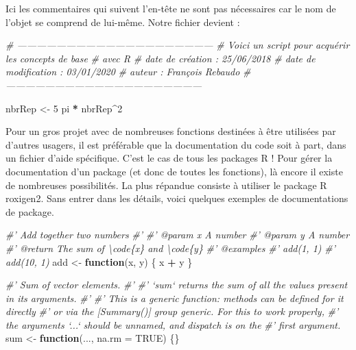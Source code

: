 \documentclass[
]{book}
\newenvironment{Shaded}{\begin{snugshade}}{\end{snugshade}}
\newcommand{\CommentTok}[1]{\textcolor[rgb]{0.56,0.35,0.01}{\textit{#1}}}
\newcommand{\ControlFlowTok}[1]{\textcolor[rgb]{0.13,0.29,0.53}{\textbf{#1}}}
\newcommand{\DataTypeTok}[1]{\textcolor[rgb]{0.13,0.29,0.53}{#1}}
\newcommand{\DecValTok}[1]{\textcolor[rgb]{0.00,0.00,0.81}{#1}}
\newcommand{\NormalTok}[1]{#1}
\newcommand{\OperatorTok}[1]{\textcolor[rgb]{0.81,0.36,0.00}{\textbf{#1}}}
\newcommand{\OtherTok}[1]{\textcolor[rgb]{0.56,0.35,0.01}{#1}}
\newcommand{\StringTok}[1]{\textcolor[rgb]{0.31,0.60,0.02}{#1}}
\begin{document}
Ici les commentaires qui suivent l'en-tête ne sont pas nécessaires car le nom de l'objet se comprend de lui-même. Notre fichier devient :

\begin{Shaded}
\begin{Highlighting}[]
\CommentTok{# ------------------------------------------------------------}
\CommentTok{# Voici un script pour acquérir les concepts de base }
\CommentTok{# avec R}
\CommentTok{# date de création : 25/06/2018}
\CommentTok{# date de modification : 03/01/2020}
\CommentTok{# auteur : François Rebaudo}
\CommentTok{# ------------------------------------------------------------}

\NormalTok{nbrRep <-}\StringTok{ }\DecValTok{5}
\NormalTok{pi }\OperatorTok{*}\StringTok{ }\NormalTok{nbrRep}\OperatorTok{^}\DecValTok{2}
\end{Highlighting}
\end{Shaded}

Pour un gros projet avec de nombreuses fonctions destinées à être utilisées par d'autres usagers, il est préférable que la documentation du code soit à part, dans un fichier d'aide spécifique. C'est le cas de tous les packages R ! Pour gérer la documentation d'un package (et donc de toutes les fonctions), là encore il existe de nombreuses possibilités. La plus répandue consiste à utiliser le package R roxigen2. Sans entrer dans les détails, voici quelques exemples de documentations de package.

\begin{Shaded}
\begin{Highlighting}[]
\CommentTok{#' Add together two numbers}
\CommentTok{#'}
\CommentTok{#' @param x A number}
\CommentTok{#' @param y A number}
\CommentTok{#' @return The sum of \textbackslash{}code\{x\} and \textbackslash{}code\{y\}}
\CommentTok{#' @examples}
\CommentTok{#' add(1, 1)}
\CommentTok{#' add(10, 1)}
\NormalTok{add <-}\StringTok{ }\ControlFlowTok{function}\NormalTok{(x, y) \{}
\NormalTok{  x }\OperatorTok{+}\StringTok{ }\NormalTok{y}
\NormalTok{\}}
\end{Highlighting}
\end{Shaded}

\begin{Shaded}
\begin{Highlighting}[]
\CommentTok{#' Sum of vector elements.}
\CommentTok{#'}
\CommentTok{#' `sum` returns the sum of all the values present in its arguments.}
\CommentTok{#'}
\CommentTok{#' This is a generic function: methods can be defined for it directly}
\CommentTok{#' or via the [Summary()] group generic. For this to work properly,}
\CommentTok{#' the arguments `...` should be unnamed, and dispatch is on the}
\CommentTok{#' first argument.}
\NormalTok{sum <-}\StringTok{ }\ControlFlowTok{function}\NormalTok{(..., }\DataTypeTok{na.rm =} \OtherTok{TRUE}\NormalTok{) \{\}}
\end{Highlighting}
\end{Shaded}
\end{document}
